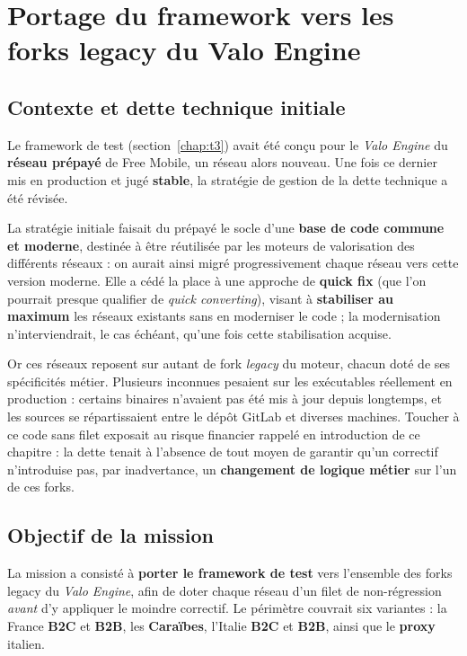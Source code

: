 \section{Portage du framework vers les forks legacy du Valo Engine}
\label{chap:t5}

\subsection{Contexte et dette technique initiale}
Le framework de test (section~\ref{chap:t3}) avait été conçu pour le
\emph{Valo Engine} du \textbf{réseau prépayé} de Free Mobile, un réseau alors
nouveau. Une fois ce dernier mis en production et jugé \textbf{stable}, la
stratégie de gestion de la dette technique a été révisée.

La stratégie initiale faisait du prépayé le socle d'une \textbf{base de code
commune et moderne}, destinée à être réutilisée par les moteurs de valorisation
des différents réseaux : on aurait ainsi migré progressivement chaque réseau
vers cette version moderne. Elle a cédé la place à une approche de \textbf{quick
fix} (que l'on pourrait presque qualifier de \emph{quick converting}), visant
à \textbf{stabiliser au maximum} les réseaux existants sans en moderniser le
code ; la modernisation n'interviendrait, le cas échéant, qu'une fois cette
stabilisation acquise.

Or ces réseaux reposent sur autant de \gls{fork} \emph{legacy} du moteur, chacun
doté de ses spécificités métier. Plusieurs inconnues pesaient sur les
exécutables réellement en production : certains binaires n'avaient pas été mis à
jour depuis longtemps, et les sources se répartissaient entre le dépôt GitLab et
diverses machines. Toucher à ce code sans filet exposait au risque financier
rappelé en introduction de ce chapitre : la dette tenait à l'absence de tout
moyen de garantir qu'un correctif n'introduise pas, par inadvertance, un
\textbf{changement de logique métier} sur l'un de ces forks.

\subsection{Objectif de la mission}
La mission a consisté à \textbf{porter le framework de test} vers l'ensemble des
forks legacy du \emph{Valo Engine}, afin de doter chaque réseau d'un filet de
non-régression \emph{avant} d'y appliquer le moindre correctif. Le périmètre
couvrait six variantes : la France \textbf{B2C} et \textbf{B2B}, les
\textbf{Caraïbes}, l'Italie \textbf{B2C} et \textbf{B2B}, ainsi que le
\textbf{proxy} italien.

